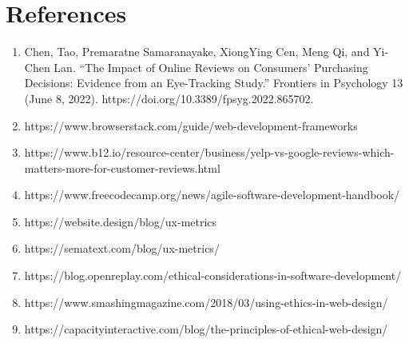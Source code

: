 \documentclass[10pt,twocolumn]{article}
\begin{document}
    \section{References}
    \begin{enumerate}
        \item Chen, Tao, Premaratne Samaranayake, XiongYing Cen, Meng Qi, and Yi-Chen Lan. “The Impact of Online Reviews on Consumers’ Purchasing Decisions: Evidence from an Eye-Tracking Study.” Frontiers in Psychology 13 (June 8, 2022). https://doi.org/10.3389/fpsyg.2022.865702. 
        \item https://www.browserstack.com/guide/web-development-frameworks
        \item https://www.b12.io/resource-center/business/yelp-vs-google-reviews-which-matters-more-for-customer-reviews.html
        \item https://www.freecodecamp.org/news/agile-software-development-handbook/
        \item https://website.design/blog/ux-metrics
        \item https://sematext.com/blog/ux-metrics/
        \item https://blog.openreplay.com/ethical-considerations-in-software-development/
        \item https://www.smashingmagazine.com/2018/03/using-ethics-in-web-design/
        \item https://capacityinteractive.com/blog/the-principles-of-ethical-web-design/
        
        
    \end{enumerate}

    
    


\printbibliography
\end{document}
